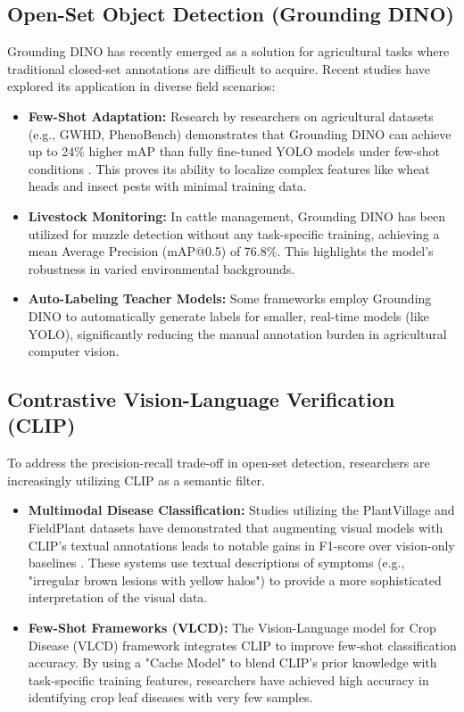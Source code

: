 \subsection{Open-Set Object Detection (Grounding DINO)}
Grounding DINO \cite{liu2023grounding} has recently emerged as a solution for agricultural tasks where traditional closed-set annotations are difficult to acquire. Recent studies have explored its application in diverse field scenarios:
\begin{itemize}
	\item \textbf{Few-Shot Adaptation:} Research by researchers on agricultural datasets (e.g., GWHD, PhenoBench) demonstrates that Grounding DINO can achieve up to 24\% higher mAP than fully fine-tuned YOLO models under few-shot conditions \cite{agri_dino_2024}. This proves its ability to localize complex features like wheat heads and insect pests with minimal training data.
	\item \textbf{Livestock Monitoring:} In cattle management, Grounding DINO has been utilized for muzzle detection without any task-specific training, achieving a mean Average Precision (mAP@0.5) of 76.8\%. This highlights the model's robustness in varied environmental backgrounds.
	\item \textbf{Auto-Labeling Teacher Models:} Some frameworks employ Grounding DINO to automatically generate labels for smaller, real-time models (like YOLO), significantly reducing the manual annotation burden in agricultural computer vision.
\end{itemize}

\subsection{Contrastive Vision-Language Verification (CLIP)}
To address the precision-recall trade-off in open-set detection, researchers are increasingly utilizing CLIP \cite{radford2021learning} as a semantic filter. 
\begin{itemize}
	\item \textbf{Multimodal Disease Classification:} Studies utilizing the PlantVillage and FieldPlant datasets have demonstrated that augmenting visual models with CLIP's textual annotations leads to notable gains in F1-score over vision-only baselines \cite{clip_plant_2024}. These systems use textual descriptions of symptoms (e.g., "irregular brown lesions with yellow halos") to provide a more sophisticated interpretation of the visual data.
	\item \textbf{Few-Shot Frameworks (VLCD):} The Vision-Language model for Crop Disease (VLCD) framework integrates CLIP to improve few-shot classification accuracy. By using a "Cache Model" to blend CLIP's prior knowledge with task-specific training features, researchers have achieved high accuracy in identifying crop leaf diseases with very few samples.
\end{itemize}

